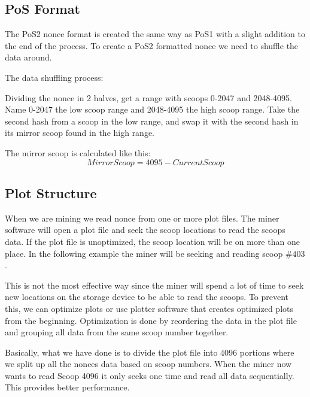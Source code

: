 \subsection{PoS Format}
\begin{flushleft}
    The PoS2 nonce format is created the same way as PoS1 with a slight addition to the end of the process. To create a PoS2 formatted nonce we need to shuffle the data around.
\end{flushleft}
\begin{flushleft}
    The data shuffling process:
\end{flushleft}
\begin{flushleft}
    Dividing the nonce in 2 halves, get a range with scoops 0-2047 and 2048-4095. Name 0-2047 the low scoop range and 2048-4095 the high scoop range. Take the second hash from a scoop in the low range, and swap it with the second hash in its mirror scoop found in the high range.
\end{flushleft}
\begin{flushleft}
    The mirror scoop is calculated like this:
    \begin{equation}
        MirrorScoop = 4095 - CurrentScoop
    \end{equation}
\end{flushleft}

\subsection{Plot Structure}
\begin{flushleft}
    When we are mining we read nonce from one or more plot files. The miner software will open a plot file and seek the scoop locations to read the scoops data. If the plot file is unoptimized, the scoop location will be on more than one place. In the following example the miner will be seeking and reading scoop $\#403$.
\end{flushleft}

\begin{flushleft}
    This is not the most effective way since the miner will spend a lot of time to seek new locations on the storage device to be able to read the scoops. To prevent this, we can optimize plots or use plotter software that creates optimized plots from the beginning. Optimization is done by reordering the data in the plot file and grouping all data from the same scoop number together.
\end{flushleft}

\begin{flushleft}
    Basically, what we have done is to divide the plot file into 4096 portions where we split up all the nonces data based on scoop numbers. When the miner now wants to read Scoop 4096 it only seeks one time and read all data sequentially. This provides better performance.
\end{flushleft}
